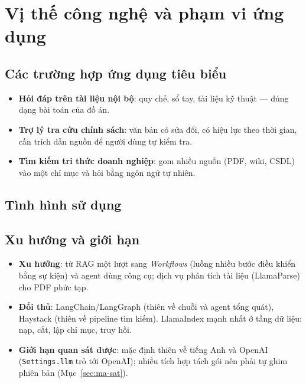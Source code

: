 \chapter{Vị thế công nghệ và phạm vi ứng dụng}
\label{ch:vi-the}

\section{Các trường hợp ứng dụng tiêu biểu}

\begin{itemize}
  \item \textbf{Hỏi đáp trên tài liệu nội bộ}: quy chế, sổ tay, tài liệu kỹ thuật --- đúng dạng bài toán
        của đồ án.
  \item \textbf{Trợ lý tra cứu chính sách}: văn bản có sửa đổi, có hiệu lực theo thời gian, cần trích dẫn
        nguồn để người dùng tự kiểm tra.
  \item \textbf{Tìm kiếm tri thức doanh nghiệp}: gom nhiều nguồn (PDF, wiki, CSDL) vào một chỉ mục và hỏi
        bằng ngôn ngữ tự nhiên.
\end{itemize}

\section{Tình hình sử dụng}


\section{Xu hướng và giới hạn}

\begin{itemize}
  \item \textbf{Xu hướng}: từ RAG một lượt sang \emph{Workflows} (luồng nhiều bước điều khiển bằng sự
        kiện) và agent dùng công cụ; dịch vụ phân tích tài liệu (LlamaParse) cho PDF phức tạp.
  \item \textbf{Đối thủ}: LangChain/LangGraph (thiên về chuỗi và agent tổng quát), Haystack (thiên về
        pipeline tìm kiếm). LlamaIndex mạnh nhất ở tầng dữ liệu: nạp, cắt, lập chỉ mục, truy hồi.
  \item \textbf{Giới hạn quan sát được}: mặc định thiên về tiếng Anh và OpenAI (\texttt{Settings.llm} trỏ
        tới OpenAI); nhiều tích hợp tách gói nên phải tự ghim phiên bản (Mục~\ref{sec:ma-sat}).
\end{itemize}

